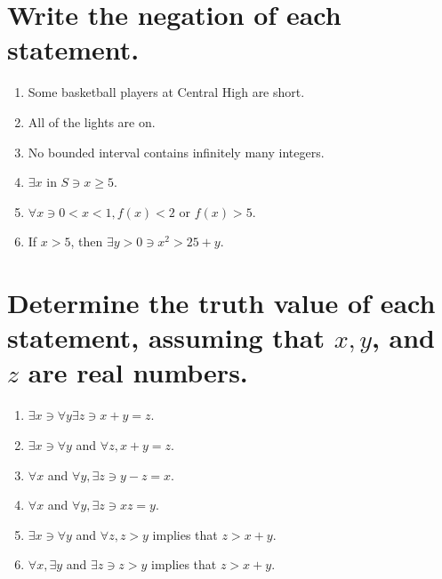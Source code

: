 \documentclass[11pt]{article} %
\begin{document}
\section{Write the negation of each statement.}
\begin{enumerate}
\item Some basketball players at Central High are short.
\item All of the lights are on.
\item No bounded interval contains infinitely many integers.
\item $\exists x$ in $S \ni x \geq 5$.
\item $\forall x \ni 0 <x<1, f(x)<2$ or $ f(x)>5$.
\item If $x>5$, then $\exists y>0\ni x^2>25+y$.
\end{enumerate}

\section{Determine the truth value of each statement, assuming that $x,y$, and $z$ are real numbers.}
\begin{enumerate}
\item $\exists x\ni\forall y \exists z\ni x+y=z$.
\item $\exists x \ni\forall y$ and $\forall z, x+y=z$.
\item $\forall x$ and $\forall y,\exists z \ni y-z=x$.
\item $\forall x$ and $\forall y,\exists z \ni xz=y$.
\item $\exists x \ni \forall y$ and $\forall z, z>y$ implies that $z>x+y$.
\item $\forall x, \exists y$ and $\exists z \ni z>y$ implies that $z>x+y$.
\end{enumerate}
\end{document}
